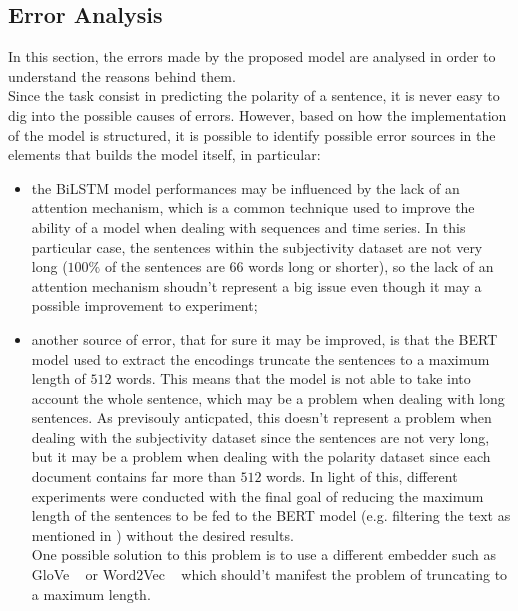 \subsection{Error Analysis}
\label{subsec:err}
In this section, the errors made by the proposed model are analysed in order to understand the reasons behind them.\\
Since the task consist in predicting the polarity of a sentence, it is never easy to dig into the possible causes of errors. However, based on how the implementation 
of the model is structured, it is possible to identify possible error sources in the elements that builds the model itself, in particular:
\begin{itemize}

    \item the BiLSTM model performances may be influenced by the lack of an attention mechanism, which is a common technique used to improve the ability of a model when 
        dealing with sequences and time series. In this particular case, the sentences within the subjectivity dataset are not very long ($100\%$ of the sentences are 
        $66$ words long or shorter), so the lack of an attention mechanism shoudn't represent a big issue even though it may a possible improvement to experiment;

    \item another source of error, that for sure it may be improved, is that the BERT model used to extract the encodings truncate the sentences to a maximum length of $512$ 
        words. This means that the model is not able to take into account the whole sentence, which may be a problem when dealing with long sentences. As previsouly anticpated,
        this doesn't represent a problem when dealing with the subjectivity dataset since the sentences are not very long, but it may be a problem when dealing with the 
        polarity dataset since each document contains far more than $512$ words. In light of this, different experiments were conducted with the final goal of reducing the 
        maximum length of the sentences to be fed to the BERT model (e.g. filtering the text as mentioned in ) without the desired results. \\
        One possible solution to this problem is to use a different embedder such as GloVe ~\cite{glove} or Word2Vec ~\cite{word2vec} which should't manifest the problem of 
        truncating to a maximum length.

\end{itemize}

